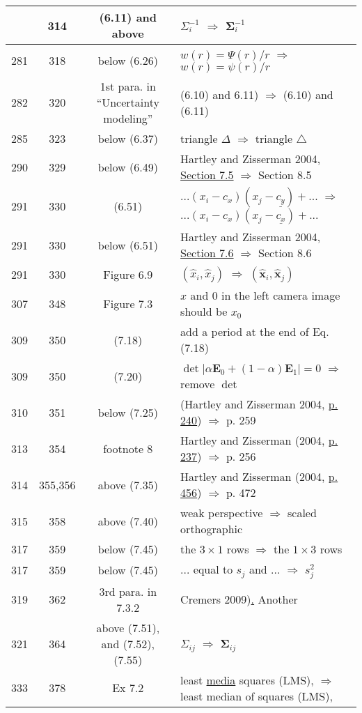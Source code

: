 \documentclass[10pt]{article}
\begin{document}
\begin{tabular}{|c|c|c|l|}
    & 314 & (6.11) and above & $\Sigma_i^{-1}$ $\Rightarrow$ $\boldsymbol{\Sigma}_i^{-1}$ \\\hline
281 & 318 & below (6.26) & $w(r)=\Psi (r) / r$ $\Rightarrow$ $w(r)=\psi (r) / r$ \\\hline
282 & 320 & 1st para. in ``Uncertainty modeling'' & (6.10) and 6.11) $\Rightarrow$ (6.10) and (6.11) \\\hline
285 & 323 & below (6.37) & triangle $\Delta$ $\Rightarrow$ triangle $\triangle$ \\\hline
290 & 329 & below (6.49) & Hartley and Zisserman 2004, \underline{Section 7.5} $\Rightarrow$ Section 8.5 \\\hline
291 & 330 & (6.51) & $... (x_i - c_x)(x_j - \underline{c_y}) + ...$ $\Rightarrow$ $... (x_i - c_x)(x_j - \underline{c_x}) + ...$ \\\hline
291 & 330 & below (6.51) & Hartley and Zisserman 2004, \underline{Section 7.6} $\Rightarrow$ Section 8.6 \\\hline
291 & 330 & Figure 6.9 & $(\hat{x}_i, \hat{x}_j)$ $\Rightarrow$ $(\boldsymbol{\hat{x}}_i, \boldsymbol{\hat{x}}_j)$ \\\hline
307 & 348 & Figure 7.3 & $x$ and 0 in the left camera image should be $x_0$ \\\hline
309 & 350 & (7.18) & add a period at the end of Eq.(7.18) \\\hline
309 & 350 & (7.20) & $\det |\alpha \boldsymbol{E}_0 + (1-\alpha)\boldsymbol{E}_1|=0$ $\Rightarrow$ remove $\det$ \\\hline
310 & 351 & below (7.25) & (Hartley and Zisserman 2004, \underline{p. 240}) $\Rightarrow$ p. 259 \\\hline
313 & 354 & footnote 8 & Hartley and Zisserman (2004, \underline{p. 237}) $\Rightarrow$ p. 256 \\\hline
314 & 355,356 & above (7.35) & Hartley and Zisserman (2004, \underline{p. 456}) $\Rightarrow$ p. 472 \\\hline
315 & 358 & above (7.40) & weak perspective $\Rightarrow$ scaled orthographic \\\hline
317 & 359 & below (7.45) & the $3 \times 1$ rows $\Rightarrow$ the $1 \times 3$ rows \\\hline
317 & 359 & below (7.45) & ... equal to \underline{$s_j$} and ... $\Rightarrow$ $s_j^2$ \\\hline
319 & 362 & 3rd para. in 7.3.2 & Cremers 2009)\underline{.} Another \\\hline
321 & 364 & above (7.51), and (7.52), (7.55) & $\Sigma_{ij}$ $\Rightarrow$ $\boldsymbol{\Sigma}_{ij}$ \\\hline
333 & 378 & Ex 7.2 & least \underline{media} squares (LMS), $\Rightarrow$ least median of squares (LMS), \\\hline
\end{tabular}
\end{document}
